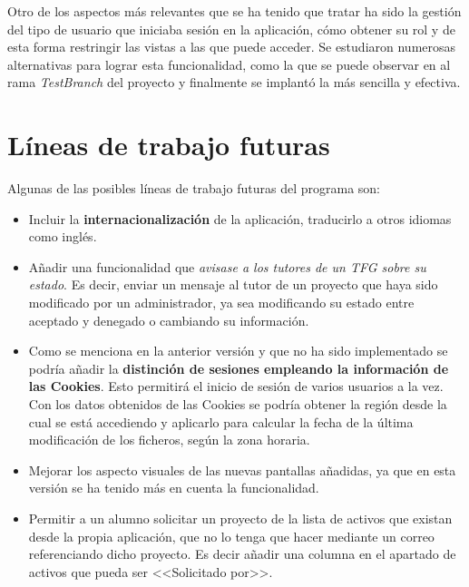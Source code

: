 Otro de los aspectos más relevantes que se ha tenido que tratar ha sido la gestión del tipo de usuario que iniciaba sesión en la aplicación, cómo obtener su rol y de esta forma restringir las vistas a las que puede acceder. Se estudiaron numerosas alternativas para lograr esta funcionalidad, como la que se puede observar en al rama \emph{TestBranch} del proyecto y finalmente se implantó la más sencilla y efectiva.

\section{Líneas de trabajo futuras}

Algunas de las posibles líneas de trabajo futuras del programa son:

\begin{itemize}
	\item Incluir la \textbf{internacionalización} de la aplicación, traducirlo a otros idiomas como inglés.
	\item Añadir una funcionalidad que \emph{avisase a los tutores de un TFG sobre su estado}. Es decir, enviar un mensaje al tutor de un proyecto que haya sido modificado por un administrador, ya sea modificando su estado entre aceptado y denegado o cambiando su información.
	\item Como se menciona en la anterior versión y que no ha sido implementado se podría añadir la \textbf{distinción de sesiones empleando la información de
	las Cookies}. Esto permitirá el inicio de sesión de varios usuarios a la
	vez. Con los datos obtenidos de las Cookies se podría obtener la región
	desde la cual se está accediendo y aplicarlo para calcular la fecha de
	la última modificación de los ficheros, según la zona horaria.
	\item Mejorar los aspecto visuales de las nuevas pantallas añadidas, ya que en esta versión se ha tenido más en cuenta la funcionalidad.
	\item Permitir a un alumno solicitar un proyecto de la lista de activos que existan desde la propia aplicación, que no lo tenga que hacer mediante un correo referenciando dicho proyecto. Es decir añadir una columna en el apartado de activos que pueda ser <<Solicitado por>>.
	
\end{itemize}
